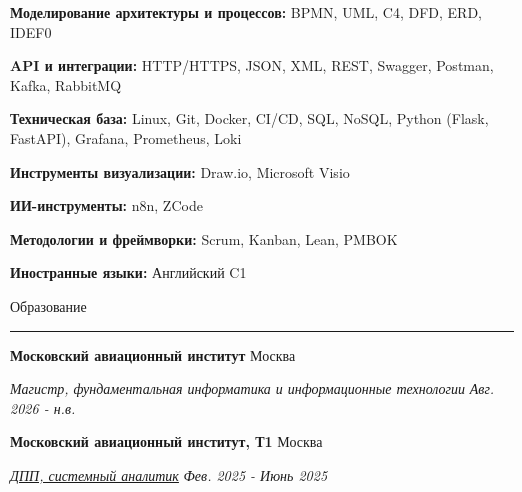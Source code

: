 \documentclass[14pt, a4paper, oneside]{extarticle}
\begin{document}
\textbf{Моделирование архитектуры и процессов:} BPMN, UML, C4, DFD, ERD, IDEF0

\textbf{API и интеграции:} HTTP/HTTPS, JSON, XML, REST, Swagger, Postman, Kafka, RabbitMQ

\textbf{Техническая база:} Linux, Git, Docker, CI/CD, SQL, NoSQL, Python (Flask, FastAPI), Grafana, Prometheus, Loki

\textbf{Инструменты визуализации:} Draw.io, Microsoft Visio

\textbf{ИИ-инструменты:} n8n, ZCode

\textbf{Методологии и фреймворки:} Scrum, Kanban, Lean, PMBOK

\textbf{Иностранные языки:} Английский C1


\begin{flushleft}
	\vspace{-\intextsep}
	\large Образование
\end{flushleft}

\vspace{-0.8\intextsep}
\hrule


\begin{flushleft}
	\vspace{-0.8\intextsep}
	\quad
	\textbf{Московский авиационный институт}
	\hfill
	Москва
\end{flushleft}

\begin{flushleft}
	\vspace{-\intextsep}
	\quad
	\textit{\footnotesize Магистр, фундаментальная информатика и информационные технологии} 
	\hfill
	\textit{\small Авг. 2026 - н.в.}
\end{flushleft}


\begin{flushleft}
	\vspace{-0.8\intextsep}
	\quad
	\textbf{Московский авиационный институт, Т1}
	\hfill
	Москва
\end{flushleft}

\begin{flushleft}
	\vspace{-\intextsep}
	\quad
	\href{https://github.com/Crazy5202/job_application_form/tree/main/portfolio/T1/%D0%A21_%D1%81%D0%B5%D1%80%D1%82%D0%B8%D1%84%D0%B8%D0%BA%D0%B0%D1%82.pdf}{\textit{ДПП, системный аналитик}}
	\hfill
	\textit{\small Фев. 2025 - Июнь 2025}
\end{flushleft}
\end{document}
